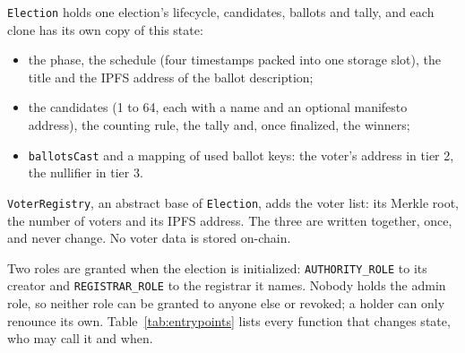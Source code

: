 \texttt{Election} holds one election's lifecycle, candidates, ballots and
tally, and each clone has its own copy of this state:

\begin{itemize}
  \item the phase, the schedule (four timestamps packed into one storage
        slot), the title and the IPFS address of the ballot description;
  \item the candidates (1 to 64, each with a name and an optional manifesto
        address), the counting rule, the tally and, once finalized, the
        winners;
  \item \texttt{ballotsCast} and a mapping of used ballot keys: the voter's
        address in tier 2, the nullifier in tier 3.
\end{itemize}

\texttt{VoterRegistry}, an abstract base of \texttt{Election}, adds the voter
list: its Merkle root, the number of voters and its IPFS address. The three
are written together, once, and never change. No voter data is stored
on-chain.

Two roles are granted when the election is initialized:
\texttt{AUTHORITY\_ROLE} to its creator and \texttt{REGISTRAR\_ROLE} to the
registrar it names. Nobody holds the admin role, so neither role can be
granted to anyone else or revoked; a holder can only renounce its own.
Table~\ref{tab:entrypoints} lists every function that changes state, who may
call it and when.

